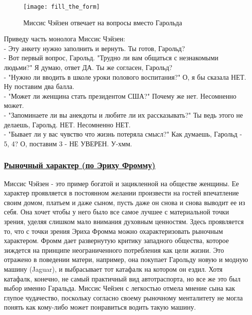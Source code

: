 \documentclass[a4paper,12pt]{report} %
\begin{document}
\begin{figure}[!h]
	\centering
	\texttt{[image: fill\_the\_form]}
	\caption{Миссис Чэйзен отвечает на вопросы вместо Гарольда}
\end{figure}

\newpage

Приведу часть монолога Миссис Чэйзен: \\

{\small
 - Эту анкету нужно заполнить и вернуть. Ты готов, Гарольд? \\
 - Вот первый вопрос, Гарольд. "Трудно ли вам общаться с незнакомыми людьми?" Я думаю, ответ ДА. Ты же согласен, Гарольд? \\
 - "Нужно ли вводить в школе уроки полового воспитания?" О, я бы сказала НЕТ. Ну поставим два балла. \\
 - "Может ли женщина стать президентом США?" Почему же нет. Несомненно может. \\
 - "Запоминаете ли вы анекдоты и любите ли их рассказывать?" Ты ведь этого не делаешь, Гарольд. НЕТ. Несомненно НЕТ. \\
 - "Бывает ли у вас чувство что жизнь потеряла смысл?" Как думаешь, Гарольд - 5, 4? О, поставим 3 - НЕ УВЕРЕН. У-хмм. \\
}

\subsubsection{\underline{Рыночный характер (по Эриху Фромму)}}

Миссис Чэйзен - это пример богатой и зацикленной на обществе женщины. Ее характер проявляется в постоянном желании произвести на гостей впечатление своим домом, платьем и даже сыном, пусть даже он снова и снова выводит ее из себя. Она хочет чтобы у него было все самое лучшее с материальной точки зрения, уделяя слишком мало внимания духовным ценностям. Здесь проявляется то, что с точки зрения Эриха Фромма можно охарактеризовать рыночным характером. Фромм дает развернутую критику западного общества, которое зиждется на принципе неограниченного потребления как цели жизни. Это отражено в поведении матери, например, она покупает Гарольду новую и модную машину (Jaguar), и выбрасывает тот катафалк на котором он ездил. Хотя катафалк, конечно, не самый практичный вид автотраспорта, но все же это был выбор именно Гаральда. Миссис Чейзен с легкостью отмела мнение сына как глупое чудачество, поскольку согласно своему рыночному менталитету не могла понять как кому-либо может понравиться водить такую машину. 
\end{document}
